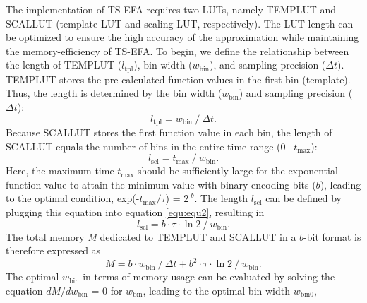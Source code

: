 \documentclass[10pt,journal]{IEEEtran}
\begin{document}
The implementation of TS-EFA requires two LUTs, namely TEMP\textunderscore LUT and SCAL\textunderscore LUT (template LUT and scaling LUT, respectively). 
The LUT length can be optimized to ensure the high accuracy of the approximation while maintaining the memory-efficiency of TS-EFA. 
To begin, we define the relationship between the length of TEMP\textunderscore LUT ($l_\textrm{tpl}$), bin width ($w_\textrm{bin}$), and sampling precision ($\Delta t$). 
TEMP\textunderscore LUT stores the pre-calculated function values in the first bin (template). 
Thus, the length is determined by the bin width ($w_\textrm{bin}$) and sampling precision ($\Delta t$):
\begin{equation}\label{equ:equ1}
    l_{\textrm{tpl}}=w_{\textrm{bin}}\mathbin{/}\Delta t.
\end{equation}
Because SCAL\textunderscore LUT stores the first function value in each bin, the length of SCAL\textunderscore LUT equals the number of bins in the entire time range (0 \textendash~$t_\textrm{max}$):
\begin{equation}\label{equ:equ2}
    l_{\textrm{scl}}=t_{\textrm{max}}\mathbin{/}w_{\textrm{bin}}.	
\end{equation}
Here, the maximum time $t_\textrm{max}$ should be sufficiently large for the exponential function value to attain the minimum value with binary encoding bits ($b$), leading to the optimal condition, exp(-$t_\textrm{max}$$\mathbin{/}$$\tau$) = $2^{\textrm{-}b}$. 
The length $l_\textrm{scl}$ can be defined by plugging this equation into equation  \eqref{equ:equ2}, resulting in
\begin{equation}\label{equ:equ3}
    l_\textrm{scl} = b \cdot \tau \cdot \ln2 \mathbin{/} w_\textrm{bin}.	
\end{equation}
The total memory \textit{M} dedicated to TEMP\textunderscore LUT and SCAL\textunderscore LUT in a $b$-bit format is therefore expressed as
\begin{equation}\label{equ:equ4}
    M=b\cdot w_{\textrm{bin}}\mathbin{/}\Delta t + b^2 \cdot\tau\cdot \ln2\mathbin{/}w_\textrm{bin}. 
\end{equation}
The optimal $w_\textrm{bin}$ in terms of memory usage can be evaluated by solving the equation $d\textit{M}$$\mathbin{/}$$dw_\textrm{bin}$ = 0 for $w_\textrm{bin}$, leading to the optimal bin width $w_\textrm{bin0}$,
\end{document}
